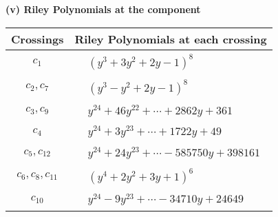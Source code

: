 \documentclass[1p]{elsarticle_modified}
\theoremstyle{definition}
\begin{document}
\newpage\renewcommand{\arraystretch}{1}
\flushleft \textbf{(v) Riley Polynomials at the component}\newline \\
\begin{tabular}{m{50pt}|m{274pt}}
Crossings & \hspace{64pt}Riley Polynomials at each crossing \\
\hline $$\begin{aligned}c_{1}\end{aligned}$$&$\begin{aligned}
&(y^3+3 y^2+2 y-1)^8
\end{aligned}$\\
\hline $$\begin{aligned}c_{2},c_{7}\end{aligned}$$&$\begin{aligned}
&(y^3- y^2+2 y-1)^8
\end{aligned}$\\
\hline $$\begin{aligned}c_{3},c_{9}\end{aligned}$$&$\begin{aligned}
&y^{24}+46 y^{22}+\cdots+2862 y+361
\end{aligned}$\\
\hline $$\begin{aligned}c_{4}\end{aligned}$$&$\begin{aligned}
&y^{24}+3 y^{23}+\cdots+1722 y+49
\end{aligned}$\\
\hline $$\begin{aligned}c_{5},c_{12}\end{aligned}$$&$\begin{aligned}
&y^{24}+24 y^{23}+\cdots-585750 y+398161
\end{aligned}$\\
\hline $$\begin{aligned}c_{6},c_{8},c_{11}\end{aligned}$$&$\begin{aligned}
&(y^4+2 y^2+3 y+1)^6
\end{aligned}$\\
\hline $$\begin{aligned}c_{10}\end{aligned}$$&$\begin{aligned}
&y^{24}-9 y^{23}+\cdots-34710 y+24649
\end{aligned}$\\
\hline
\end{tabular}\\~\\
\end{document}
